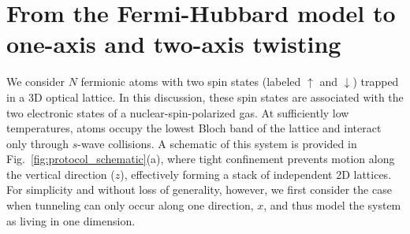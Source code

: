 \documentclass[aps,prx,superscriptaddress,twocolumn]{revtex4-2}
\newcommand{\up}{\uparrow}
\newcommand{\dn}{\downarrow}
\begin{document}
\section{From the Fermi-Hubbard model to one-axis and two-axis twisting}
\label{sec:theory}

We consider $N$ fermionic atoms with two spin states (labeled $\up$ and $\dn$) trapped in a 3D optical lattice.
In this discussion, these spin states are associated with the two electronic states of a nuclear-spin-polarized gas.
At sufficiently low temperatures, atoms  occupy the lowest Bloch band of the lattice and interact only through $s$-wave collisions.
A schematic of this system is provided in Fig.~\ref{fig:protocol_schematic}(a), where tight confinement prevents motion along the vertical direction ($z$), effectively forming a stack of independent 2D lattices.
For simplicity and without loss of generality, however, we first consider the case when tunneling can only occur along one direction, $x$, and thus model the system as living in  one dimension.
\end{document}
